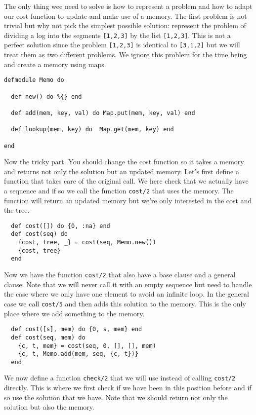 \documentclass[a4paper,11pt]{article}
\begin{document}
The only thing wee need to solve is how to represent a problem and how
to adapt our cost function to update and make use of a memory. The first
problem is not trivial but why not pick the simplest possible
solution: represent the problem of dividing a log into the segments
{\tt [1,2,3]} by the list {\tt [1,2,3]}. This is not a perfect
solution since the problem {\tt [1,2,3]} is identical to {\tt [3,1,2]}
but we will treat them as two different problems. We ignore this
problem for the time being and create a memory using maps.

\begin{verbatim}
defmodule Memo do

  def new() do %{} end

  def add(mem, key, val) do Map.put(mem, key, val) end

  def lookup(mem, key) do  Map.get(mem, key) end

end
\end{verbatim}

Now the tricky part. You should change the cost function so it takes a
memory and returns not only the solution but an updated memory. Let's
first define a function that takes care of the original call. We here
check that we actually have a sequence and if so we call the function
{\tt cost/2} that uses the memory. The function will return an updated
memory but we're only interested in the cost and the tree.

\begin{verbatim}
  def cost([]) do {0, :na} end
  def cost(seq) do
    {cost, tree, _} = cost(seq, Memo.new())
    {cost, tree}
  end
\end{verbatim}


Now we have the function {\tt cost/2} that also have a base clause and
a general clause. Note that we will never call it with an empty sequence
but need to handle the case where we only have one element to avoid an
infinite loop. In the general case we call {\tt cost/5} and then adds
this solution to the memory. This is the only place where we add
something to the memory.

\begin{verbatim}
  def cost([s], mem) do {0, s, mem} end
  def cost(seq, mem) do
    {c, t, mem} = cost(seq, 0, [], [], mem)
    {c, t, Memo.add(mem, seq, {c, t})}
  end  
\end{verbatim}


We now define a function {\tt check/2} that we will use instead of
calling {\tt cost/2} directly. This is where we first check if we have
been in this position before and if so use the solution that we
have. Note that we should return not only the solution but also the
memory.
\end{document}
